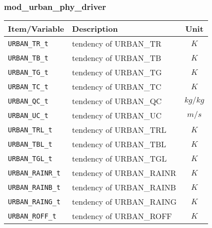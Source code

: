 \subsubsection{mod\_urban\_phy\_driver}
 \begin{tabularx}{150mm}{|l|X|c|} \hline
 \rowcolor[gray]{0.9} Item/Variable & Description  & Unit \\\hline
  \verb|URBAN_TR_t|    & tendency of URBAN\_TR     &  $K$ \\\hline
  \verb|URBAN_TB_t|    & tendency of URBAN\_TB     &  $K$ \\\hline
  \verb|URBAN_TG_t|    & tendency of URBAN\_TG     &  $K$ \\\hline
  \verb|URBAN_TC_t|    & tendency of URBAN\_TC     &  $K$ \\\hline
  \verb|URBAN_QC_t|    & tendency of URBAN\_QC     &  $kg/kg$ \\\hline
  \verb|URBAN_UC_t|    & tendency of URBAN\_UC     &  $m/s$ \\\hline
  \verb|URBAN_TRL_t|   & tendency of URBAN\_TRL    &  $K$ \\\hline
  \verb|URBAN_TBL_t|   & tendency of URBAN\_TBL    &  $K$ \\\hline
  \verb|URBAN_TGL_t|   & tendency of URBAN\_TGL    &  $K$ \\\hline
  \verb|URBAN_RAINR_t| & tendency of URBAN\_RAINR  & $K$ \\\hline
  \verb|URBAN_RAINB_t| & tendency of URBAN\_RAINB  & $K$ \\\hline
  \verb|URBAN_RAING_t| & tendency of URBAN\_RAING  & $K$ \\\hline
  \verb|URBAN_ROFF_t|  & tendency of URBAN\_ROFF   & $K$ \\\hline
 \end{tabularx}

